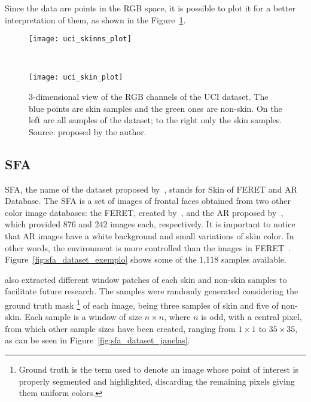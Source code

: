 Since the data are points in the RGB space, it is possible to plot it for a better interpretation of them, as shown in the Figure~\ref{fig:dataset_uci}.

\begin{figure}[H]
    \centering
    \begin{minipage}{0.45\textwidth}
        \texttt{[image: uci\_skinns\_plot]}
    \end{minipage}
    ~ %
    \begin{minipage}{0.45\textwidth}
        \texttt{[image: uci\_skin\_plot]}
    \end{minipage}
    \caption[3-dimensional view of the RGB channels of the UCI dataset]{3-dimensional view of the RGB channels of the UCI dataset. The blue points are skin samples and the green ones are non-skin. On the left are all samples of the dataset; to the right only the skin samples. Source: proposed by the author.}
    \label{fig:dataset_uci}
\end{figure}


\subsection{SFA}
\label{sec:datasets_sfa}
SFA, the name of the dataset proposed by~\citet{sfa-skin-dataset:13}, stands for Skin of FERET and AR Database. The SFA is a set of images of frontal faces obtained from two other color image databases: the FERET, created by~\citet{feret:96}, and the AR proposed by~\citet{ar-face-database:98}, which provided 876 and 242 images each, respectively. It is important to notice that AR images have a white background and small variations of skin color. In other words, the environment is more controlled than the images in FERET~\citep{sfa-skin-dataset:13}. Figure~\ref{fig:sfa_dataset_exemplo} shows some of the 1,118 samples available.

\citet{sfa-skin-dataset:13} also extracted different window patches of each skin and non-skin samples to facilitate future research. The samples were randomly generated considering the ground truth mask \footnote{Ground truth is the term used to denote an image whose point of interest is properly segmented and highlighted, discarding the remaining pixels giving them uniform colors.} of each image, being three samples of skin and five of non-skin. Each sample is a window of size $n \times n$, where $n$ is odd, with a central pixel, from which other sample sizes have been created, ranging from $1 \times 1$ to $35 \times 35$, as can be seen in Figure~\ref{fig:sfa_dataset_janelas}.

